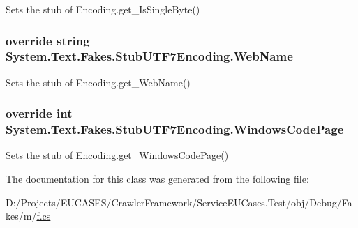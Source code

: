 Sets the stub of Encoding.\-get\-\_\-\-Is\-Single\-Byte()

\hypertarget{class_system_1_1_text_1_1_fakes_1_1_stub_u_t_f7_encoding_a1bacc75ad8ee913346ad5f15c16de40b}{
\subsubsection[{Web\-Name}]{\setlength{\rightskip}{0pt plus 5cm}override string System.\-Text.\-Fakes.\-Stub\-U\-T\-F7\-Encoding.\-Web\-Name\hspace{0.3cm}{\ttfamily [get]}}}\label{class_system_1_1_text_1_1_fakes_1_1_stub_u_t_f7_encoding_a1bacc75ad8ee913346ad5f15c16de40b}


Sets the stub of Encoding.\-get\-\_\-\-Web\-Name()

\hypertarget{class_system_1_1_text_1_1_fakes_1_1_stub_u_t_f7_encoding_a1de5ed7319c71add499985ec504017a3}{
\subsubsection[{Windows\-Code\-Page}]{\setlength{\rightskip}{0pt plus 5cm}override int System.\-Text.\-Fakes.\-Stub\-U\-T\-F7\-Encoding.\-Windows\-Code\-Page\hspace{0.3cm}{\ttfamily [get]}}}\label{class_system_1_1_text_1_1_fakes_1_1_stub_u_t_f7_encoding_a1de5ed7319c71add499985ec504017a3}


Sets the stub of Encoding.\-get\-\_\-\-Windows\-Code\-Page()



The documentation for this class was generated from the following file\-:\begin{DoxyCompactItemize}
\item 
D\-:/\-Projects/\-E\-U\-C\-A\-S\-E\-S/\-Crawler\-Framework/\-Service\-E\-U\-Cases.\-Test/obj/\-Debug/\-Fakes/m/\hyperlink{m_2f_8cs}{f.\-cs}\end{DoxyCompactItemize}
